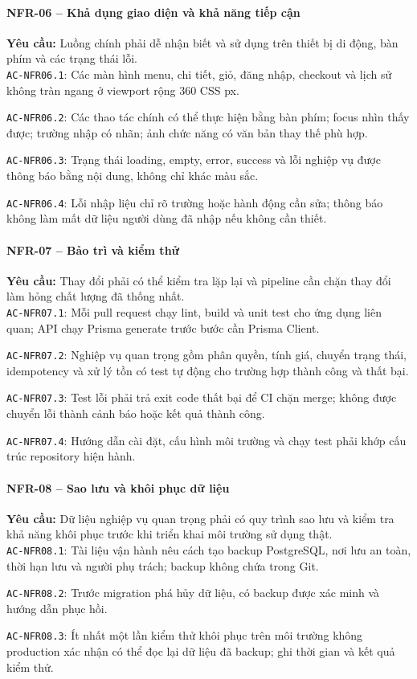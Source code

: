 \paragraph{NFR-06 -- Khả dụng giao diện và khả năng tiếp cận}
\textbf{Yêu cầu:} Luồng chính phải dễ nhận biết và sử dụng trên thiết bị di động, bàn phím và các trạng thái lỗi.\\
\noindent\texttt{AC-NFR06.1}: Các màn hình menu, chi tiết, giỏ, đăng nhập, checkout và lịch sử không tràn ngang ở viewport rộng 360 CSS px.\par
\noindent\texttt{AC-NFR06.2}: Các thao tác chính có thể thực hiện bằng bàn phím; focus nhìn thấy được; trường nhập có nhãn; ảnh chức năng có văn bản thay thế phù hợp.\par
\noindent\texttt{AC-NFR06.3}: Trạng thái loading, empty, error, success và lỗi nghiệp vụ được thông báo bằng nội dung, không chỉ khác màu sắc.\par
\noindent\texttt{AC-NFR06.4}: Lỗi nhập liệu chỉ rõ trường hoặc hành động cần sửa; thông báo không làm mất dữ liệu người dùng đã nhập nếu không cần thiết.\par

\paragraph{NFR-07 -- Bảo trì và kiểm thử}
\textbf{Yêu cầu:} Thay đổi phải có thể kiểm tra lặp lại và pipeline cần chặn thay đổi làm hỏng chất lượng đã thống nhất.\\
\noindent\texttt{AC-NFR07.1}: Mỗi pull request chạy lint, build và unit test cho ứng dụng liên quan; API chạy Prisma generate trước bước cần Prisma Client.\par
\noindent\texttt{AC-NFR07.2}: Nghiệp vụ quan trọng gồm phân quyền, tính giá, chuyển trạng thái, idempotency và xử lý tồn có test tự động cho trường hợp thành công và thất bại.\par
\noindent\texttt{AC-NFR07.3}: Test lỗi phải trả exit code thất bại để CI chặn merge; không được chuyển lỗi thành cảnh báo hoặc kết quả thành công.\par
\noindent\texttt{AC-NFR07.4}: Hướng dẫn cài đặt, cấu hình môi trường và chạy test phải khớp cấu trúc repository hiện hành.\par

\paragraph{NFR-08 -- Sao lưu và khôi phục dữ liệu}
\textbf{Yêu cầu:} Dữ liệu nghiệp vụ quan trọng phải có quy trình sao lưu và kiểm tra khả năng khôi phục trước khi triển khai môi trường sử dụng thật.\\
\noindent\texttt{AC-NFR08.1}: Tài liệu vận hành nêu cách tạo backup PostgreSQL, nơi lưu an toàn, thời hạn lưu và người phụ trách; backup không chứa trong Git.\par
\noindent\texttt{AC-NFR08.2}: Trước migration phá hủy dữ liệu, có backup được xác minh và hướng dẫn phục hồi.\par
\noindent\texttt{AC-NFR08.3}: Ít nhất một lần kiểm thử khôi phục trên môi trường không production xác nhận có thể đọc lại dữ liệu đã backup; ghi thời gian và kết quả kiểm thử.\par
